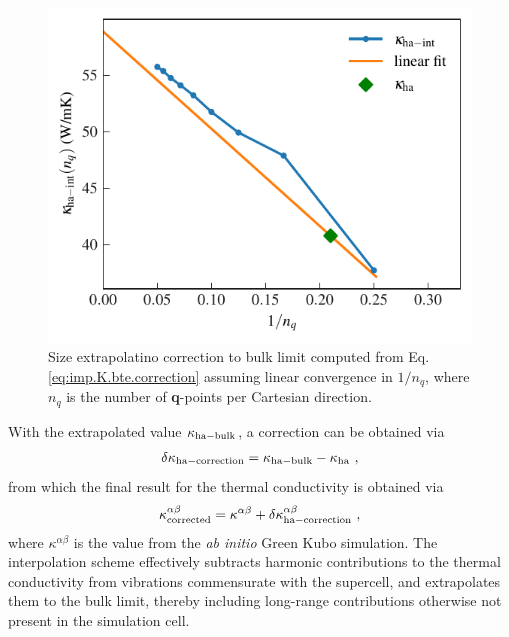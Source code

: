 \begin{figure}
	\includegraphics[width=.8\textwidth]{./data/plots/lifetimes/greenkubo_summary_interpolation_fit.pdf}
	\caption{Size extrapolatino correction to bulk limit computed from Eq.\,\eqref{eq:imp.K.bte.correction} assuming linear convergence in $1 / n_q$, where $n_q$ is the number of {\bf q}-points per Cartesian direction.}
	\label{fig:imp.kappa.bte.correction}
\end{figure}
With the extrapolated value $\kappa_{\rm ha-bulk}$, a correction can be obtained via
\begin{align}
	\delta \kappa_{\rm ha-correction} 
		= \kappa_{\rm ha-bulk} - \kappa_{\rm ha}~,
	\label{eq:imp.K.correction}
\end{align}
from which the final result for the thermal conductivity is obtained via
\begin{align}
	\kappa^{\alpha \beta}_{\rm corrected}
		 = \kappa^{\alpha \beta} + \delta \kappa^{\alpha \beta}_{\rm ha-correction}~,
	\label{eq:imp.K.corrected}
\end{align}
where $\kappa^{\alpha \beta}$ is the value from the \emph{ab initio} Green Kubo simulation. The interpolation scheme effectively subtracts harmonic contributions to the thermal conductivity from vibrations commensurate with the supercell, and extrapolates them to the bulk limit, thereby including long-range contributions otherwise not present in the simulation cell.

